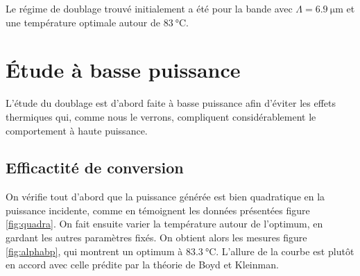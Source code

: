 \documentclass[11pt,a4paper] { article}
\begin{document}



Le régime de doublage trouvé initialement a été pour la bande avec $\Lambda = \SI{6.9}{\micro\meter}$ et une température optimale autour de $\SI{83}{\celsius}$.

\section{Étude à basse puissance}

L'étude du doublage est d'abord faite à basse puissance afin d'éviter les effets thermiques qui, comme nous le verrons, compliquent considérablement le comportement à haute puissance.

\subsection{Efficactité de conversion}

On vérifie tout d'abord que la puissance générée est bien quadratique en la puissance incidente, comme en témoignent les données présentées figure \ref{fig:quadra}. On fait ensuite varier la température autour de l'optimum, en gardant les autres paramètres fixés. On obtient alors les mesures figure \ref{fig:alphabp}, qui montrent un optimum à $\SI{83.3}{\celsius}$. L'allure de la courbe est plutôt en accord avec celle prédite par la théorie de Boyd et Kleinman. 
\end{document}
